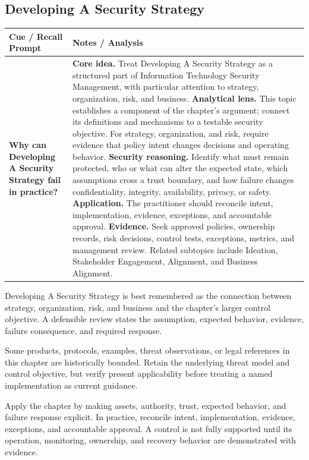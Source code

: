 \documentclass[11pt]{article}
\newcommand{\CornellHeader}{%
\rowcolor{Navy}\color{white}\bfseries Cue / Recall Prompt & \color{white}\bfseries Notes / Analysis\\\hline}
\newcommand{\CornellRow}[2]{%
\cellcolor{CueGray}\RaggedRight\textbf{#1} & \RaggedRight #2\\\hline}
\begin{document}
\subsection*{Developing A Security Strategy}
\begin{longtable}{>{\RaggedRight\arraybackslash}p{}|>{\RaggedRight\arraybackslash}p{}}
\CornellHeader
\CornellRow{Why can Developing A Security Strategy fail in practice?}{\textbf{Core idea.} Treat Developing A Security Strategy as a structured part of Information Technology Security Management, with particular attention to strategy, organization, risk, and business. \textbf{Analytical lens.} This topic establishes a component of the chapter's argument; connect its definitions and mechanisms to a testable security objective. For strategy, organization, and risk, require evidence that policy intent changes decisions and operating behavior. \textbf{Security reasoning.} Identify what must remain protected, who or what can alter the expected state, which assumptions cross a trust boundary, and how failure changes confidentiality, integrity, availability, privacy, or safety. \textbf{Application.} The practitioner should reconcile intent, implementation, evidence, exceptions, and accountable approval. \textbf{Evidence.} Seek approved policies, ownership records, risk decisions, control tests, exceptions, metrics, and management review. Related subtopics include Ideation, Stakeholder Engagement, Alignment, and Business Alignment.}
\end{longtable}
\begin{topicsummary}
Developing A Security Strategy is best remembered as the connection between strategy, organization, risk, and business and the chapter's larger control objective. A defensible review states the assumption, expected behavior, evidence, failure consequence, and required response.
\end{topicsummary}
\begin{historybox}
Some products, protocols, examples, threat observations, or legal references in this chapter are historically bounded. Retain the underlying threat model and control objective, but verify present applicability before treating a named implementation as current guidance.
\end{historybox}
\begin{defensebox}
Apply the chapter by making assets, authority, trust, expected behavior, and failure response explicit. In practice, reconcile intent, implementation, evidence, exceptions, and accountable approval. A control is not fully supported until its operation, monitoring, ownership, and recovery behavior are demonstrated with evidence.
\end{defensebox}
\end{document}
